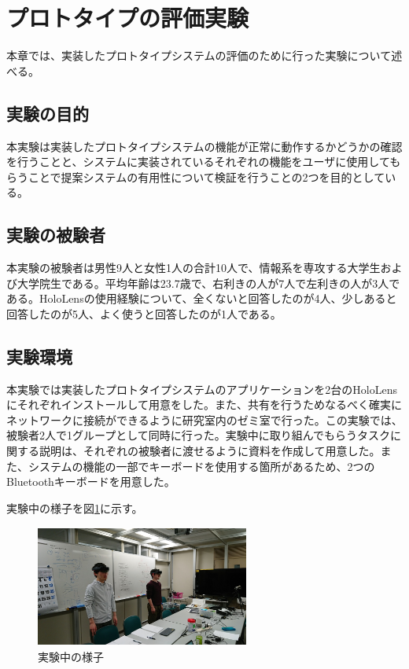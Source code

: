 \documentclass[technicalreport]{ieicej}
\begin{document}

\section{プロトタイプの評価実験}
本章では、実装したプロトタイプシステムの評価のために行った実験について述べる。

\subsection{実験の目的}
本実験は実装したプロトタイプシステムの機能が正常に動作するかどうかの確認を行うことと、システムに実装されているそれぞれの機能をユーザに使用してもらうことで提案システムの有用性について検証を行うことの2つを目的としている。

\subsection{実験の被験者}
本実験の被験者は男性9人と女性1人の合計10人で、情報系を専攻する大学生および大学院生である。平均年齢は23.7歳で、右利きの人が7人で左利きの人が3人である。HoloLensの使用経験について、全くないと回答したのが4人、少しあると回答したのが5人、よく使うと回答したのが1人である。

\subsection{実験環境}
本実験では実装したプロトタイプシステムのアプリケーションを2台のHoloLensにそれぞれインストールして用意をした。また、共有を行うためなるべく確実にネットワークに接続ができるように研究室内のゼミ室で行った。この実験では、被験者2人で1グループとして同時に行った。実験中に取り組んでもらうタスクに関する説明は、それぞれの被験者に渡せるように資料を作成して用意した。また、システムの機能の一部でキーボードを使用する箇所があるため、2つのBluetoothキーボードを用意した。

実験中の様子を図\ref{fig:jikkenchu}に示す。

\begin{figure}[h]
  \begin{center}
    \includegraphics[clip,height=4.0cm,width=7.0cm]{./jikkenchu.eps}
    \caption{実験中の様子}
    \label{fig:jikkenchu}
  \end{center}
\end{figure}
\end{document}
